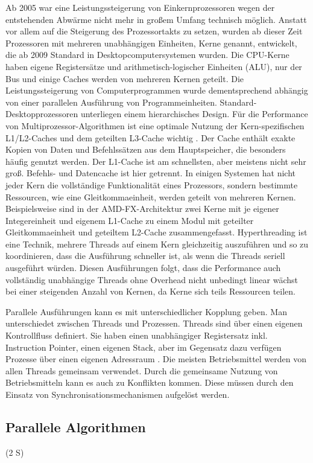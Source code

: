 \documentclass[a4paper,12pt,twoside]{article}
\begin{document}
Ab 2005 war eine Leistungssteigerung von Einkernprozessoren wegen der entstehenden Abwärme nicht mehr in großem Umfang technisch möglich. Anstatt vor allem auf die Steigerung des Prozessortakts zu setzen, wurden ab dieser Zeit Prozessoren mit mehreren unabhängigen Einheiten, Kerne genannt, entwickelt, die ab 2009 Standard in Desktopcomputersystemen wurden. Die CPU-Kerne haben eigene Registersätze und arithmetisch-logischer Einheiten (ALU), nur der Bus und einige Caches werden von mehreren Kernen geteilt. Die Leistungssteigerung von Computerprogrammen wurde dementsprechend abhängig von einer parallelen Ausführung von Programmeinheiten. Standard-Desktopprozessoren unterliegen einem hierarchisches Design. Für die Performance von Multiprozessor-Algorithmen ist eine optimale Nutzung der Kern-spezifischen L1/L2-Caches und dem geteilten L3-Cache wichtig {\autocite{Rauber2013}}. Der Cache enthält exakte Kopien von Daten und Befehlssätzen aus dem Hauptspeicher, die besonders häufig genutzt werden. Der L1-Cache ist am schnellsten, aber meistens nicht sehr groß. Befehls- und Datencache ist hier getrennt. In einigen Systemen hat nicht jeder Kern die vollständige Funktionalität eines Prozessors, sondern bestimmte Ressourcen, wie eine Gleitkommaeinheit, werden geteilt von mehreren Kernen. Beispielsweise sind in der AMD-FX-Architektur zwei Kerne mit je eigener Integereinheit und eigenem L1-Cache zu einem Modul mit geteilter Gleitkommaeinheit und geteiltem L2-Cache zusammengefasst. Hyperthreading ist eine Technik, mehrere Threads auf einem Kern gleichzeitig auszuführen und so zu koordinieren, dass die Ausführung schneller ist, als wenn die Threads seriell ausgeführt würden. Diesen Ausführungen folgt, dass die Performance auch vollständig unabhängige Threads ohne Overhead nicht unbedingt linear wächst bei einer steigenden Anzahl von Kernen, da Kerne sich teils Ressourcen teilen.

Parallele Ausführungen kann es mit unterschiedlicher Kopplung geben. Man unterschiedet zwischen Threads und Prozessen. Threads sind über einen eigenen Kontrollfluss definiert. Sie haben einen unabhängiger Registersatz inkl. Instruction Pointer, einen eigenen Stack, aber im Gegensatz dazu verfügen Prozesse über einen eigenen Adressraum {\autocite[S. 95]{Rauber2013}}. Die meisten Betriebsmittel werden von allen Threads gemeinsam verwendet. Durch die gemeinsame Nutzung von Betriebsmitteln kann es auch zu Konflikten kommen. Diese müssen durch den Einsatz von Synchronisationsmechanismen aufgelöst werden.

\subsection{Parallele Algorithmen} (2 S)
\end{document}

